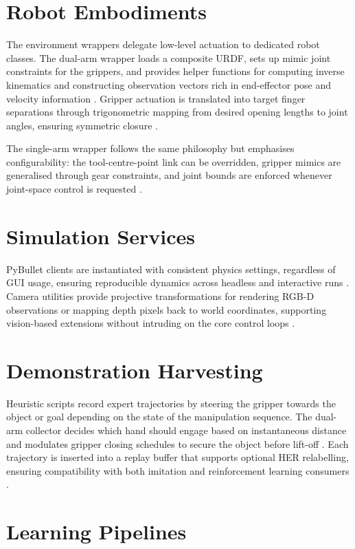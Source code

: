 \documentclass[11pt]{article}
\begin{document}
\section{Robot Embodiments}
The environment wrappers delegate low-level actuation to dedicated robot classes. The dual-arm wrapper loads a composite URDF, sets up mimic joint constraints for the grippers, and provides helper functions for computing inverse kinematics and constructing observation vectors rich in end-effector pose and velocity information \cite{dualRobotLoad, dualRobotObs}. Gripper actuation is translated into target finger separations through trigonometric mapping from desired opening lengths to joint angles, ensuring symmetric closure \cite{dualRobotGripper}.

The single-arm wrapper follows the same philosophy but emphasises configurability: the tool-centre-point link can be overridden, gripper mimics are generalised through gear constraints, and joint bounds are enforced whenever joint-space control is requested \cite{singleRobotConfig}.

\section{Simulation Services}
PyBullet clients are instantiated with consistent physics settings, regardless of GUI usage, ensuring reproducible dynamics across headless and interactive runs \cite{utilModule}. Camera utilities provide projective transformations for rendering RGB-D observations or mapping depth pixels back to world coordinates, supporting vision-based extensions without intruding on the core control loops \cite{cameraUtility}.

\section{Demonstration Harvesting}
Heuristic scripts record expert trajectories by steering the gripper towards the object or goal depending on the state of the manipulation sequence. The dual-arm collector decides which hand should engage based on instantaneous distance and modulates gripper closing schedules to secure the object before lift-off \cite{expertCollector}. Each trajectory is inserted into a replay buffer that supports optional HER relabelling, ensuring compatibility with both imitation and reinforcement learning consumers \cite{trajectoryBuffer}.

\section{Learning Pipelines}
\end{document}
